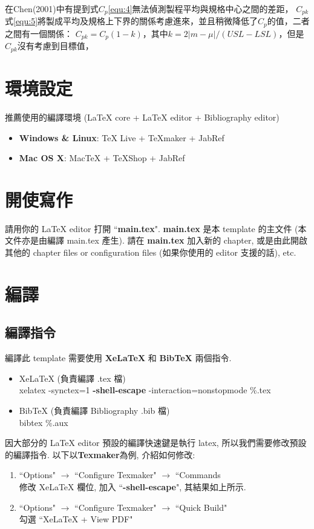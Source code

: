 在Chen(2001)\cite{Chen_2001}中有提到式$C_{p}$\ref{equ:4}無法偵測製程平均與規格中心之間的差距，
$C_{pk}$式\ref{equ:5}將製成平均及規格上下界的關係考慮進來，並且稍微降低了$C_{p}$的值，二者之間有一個關係：
$C_{pk}=C_{p}(1-k)$，其中$k=2|m-\mu|/(USL-LSL)$，但是$C_{pk}$沒有考慮到目標值，


\section{環境設定}

推薦使用的編譯環境 (LaTeX core + LaTeX editor + Bibliography editor)

\begin{itemize}
\item \textbf{Windows \& Linux}: TeX Live + TeXmaker + JabRef
\item \textbf{Mac OS X}: MacTeX + TeXShop + JabRef
\end{itemize}

\section{開使寫作}

請用你的 LaTeX editor 打開 ``\textbf{main.tex}".
\textbf{main.tex} 是本 template 的主文件 (本文件亦是由編譯 main.tex 產生).
請在 \textbf{main.tex} 加入新的 chapter, 或是由此開啟其他的 chapter files or configuration files (如果你使用的 editor 支援的話), etc.

\section{編譯}

\subsection{編譯指令}

編譯此 template 需要使用 \textbf{XeLaTeX} 和 \textbf{BibTeX} 兩個指令.

\begin{itemize}
\item XeLaTeX (負責編譯 .tex 檔)\\
xelatex -synctex=1 \textbf{-shell-escape} -interaction=nonstopmode \%.tex
\item BibTeX (負責編譯 Bibliography .bib 檔)\\
bibtex \%.aux
\end{itemize}

因大部分的 LaTeX editor 預設的編譯快速鍵是執行 latex, 所以我們需要修改預設的編譯指令.
以下以\textbf{Texmaker}為例, 介紹如何修改:
\begin{enumerate}
\item ``Options" $\rightarrow$ ``Configure Texmaker" $\rightarrow$ ``Commands\\
修改 XeLaTeX 欄位, 加入 ``\textbf{-shell-escape}", 其結果如上所示.
\item ``Options" $\rightarrow$ ``Configure Texmaker" $\rightarrow$ ``Quick Build"\\
勾選 ``XeLaTeX + View PDF"

\end{enumerate}

